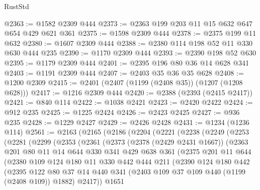 \begin{lexlean}{RustStd}
\begin{coremodule}
@2363 := @1582 @2309 @444
@2373 := @2363 @199 @203 @11 @15 @632 @647 @654 @429 @621 @361
@2375 := @1598 @2309 @444
@2378 := @2375 @199 @11 @632
@2380 := @1607 @2309 @444
@2388 := @2380 @114 @198 @52 @11 @330 @630 @444 @235
@2390 := @1170 @2309 @444
@2393 := @2390 @198 @52 @630
@2395 := @1179 @2309 @444
@2401 := @2395 @196 @80 @36 @14 @628 @341
@2403 := @1191 @2309 @444
@2407 := @2403 @35 @36 @35 @628
@2408 := @1200 @2309
@2415 := @2401 (@2407 (@1199 (@2408 @35)) (@1207 (@1208 @628)))
@2417 := @1216 @2309 @444
@2420 := @2388 (@2393 (@2415 @2417))
@2421 := @840 @114
@2422 := @1038 @2421
@2423 := @2420 @2422
@2424 := @912 @235
@2425 := @1225 @2424
@2426 := @2423 @2425
@2427 := @936 @235
@2428 := @1229 @2427
@2429 := @2426 @2428
@2431 := @1234 (@1236 @114)
@2561 := @2163
    (@2165
      (@2186
        (@2204
          (@2221
            (@2238
              (@2249
                (@2253
                  (@2281
                    (@2299
                      (@2353
                        (@2361
                          (@2373
                            (@2378 (@2429 @2431 @1667))
                            (@2363
                              @201
                              @80
                              @11
                              @14
                              @644
                              @330
                              @341
                              @429
                              @638
                              @361
                              (@2375
                                @201
                                @11
                                @644
                                (@2380
                                  @109
                                  @124
                                  @180
                                  @11
                                  @330
                                  @442
                                  @444
                                  @211
                                  (@2390
                                    @124
                                    @180
                                    @442
                                    (@2395
                                      @122
                                      @80
                                      @37
                                      @14
                                      @440
                                      @341
                                      (@2403 @109 @37 @109 @440 (@1199 (@2408 @109)) @1882)
                                      @2417))
                                  @1651

\end{coremodule}
\end{lexlean}

